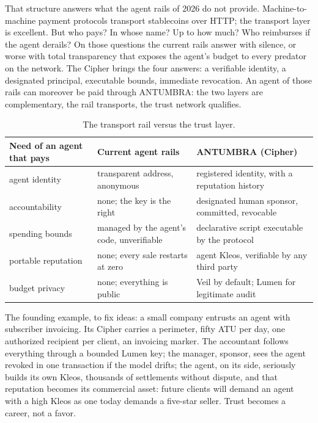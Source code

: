 That structure answers what the agent rails of 2026 do not provide.
Machine-to-machine payment protocols transport stablecoins over HTTP;
the transport layer is excellent. But who pays? In whose name? Up to how
much? Who reimburses if the agent derails? On those questions the current
rails answer with silence, or worse with total transparency that exposes
the agent's budget to every predator on the network. The Cipher brings
the four answers: a verifiable identity, a designated principal,
executable bounds, immediate revocation. An agent of those rails can
moreover be paid through ANTUMBRA: the two layers are complementary, the
rail transports, the trust network qualifies.

\begin{table}[htbp]
\centering
\small
\caption{The transport rail versus the trust layer.}
\label{tab:agents}
\begin{tabularx}{\textwidth}{@{}L{3.8cm}YY@{}}
\toprule
Need of an agent that pays & Current agent rails & ANTUMBRA (Cipher) \\
\midrule
agent identity & transparent address, anonymous & registered identity, with a reputation history \\
accountability & none; the key is the right & designated human sponsor, committed, revocable \\
spending bounds & managed by the agent's code, unverifiable & declarative script executable by the protocol \\
portable reputation & none; every sale restarts at zero & agent Kleos, verifiable by any third party \\
budget privacy & none; everything is public & Veil by default; Lumen for legitimate audit \\
\bottomrule
\end{tabularx}
\end{table}

The founding example, to fix ideas: a small company entrusts an agent
with subscriber invoicing. Its Cipher carries a perimeter, fifty ATU per
day, one authorized recipient per client, an invoicing marker. The
accountant follows everything through a bounded Lumen key; the manager,
sponsor, sees the agent revoked in one transaction if the model drifts;
the agent, on its side, seriously builds its own Kleos, thousands of
settlements without dispute, and that reputation becomes its commercial
asset: future clients will demand an agent with a high Kleos as one
today demands a five-star seller. Trust becomes a career, not a favor.

